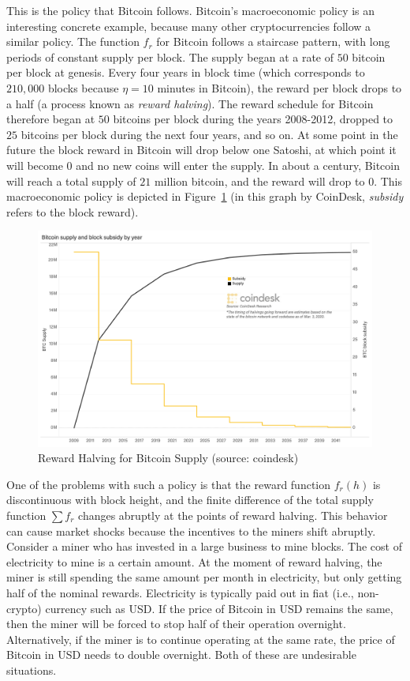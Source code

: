 This is the policy that Bitcoin follows.
Bitcoin's macroeconomic policy is an interesting concrete example, because
many other cryptocurrencies follow a similar policy. The function $f_r$
for Bitcoin follows a staircase pattern, with long periods of constant
supply per block. The supply began at a rate of $50$ bitcoin per block
at genesis. Every four years in block time (which corresponds to
$210{,}000$ blocks because $\eta = 10$ minutes in Bitcoin), the reward
per block drops to a half (a process known as \emph{reward halving}).
The reward schedule for Bitcoin therefore
began at $50$ bitcoins per block during the years 2008-2012, dropped
to $25$ bitcoins per block during the next four years, and so on. At
some point in the future the block reward in Bitcoin will drop below
one Satoshi, at which point it will become $0$ and no new coins will
enter the supply. In about a century, Bitcoin will reach a total supply
of $21$ million bitcoin, and the reward will drop to $0$. This
macroeconomic policy is depicted in Figure~\ref{fig:reward_halving}
(in this graph by CoinDesk, \emph{subsidy} refers to the block
reward).

\begin{figure}[ht]
    \centering
    \includegraphics[width=\columnwidth,keepaspectratio]{figures/reward_halving.png}
    \caption{Reward Halving for Bitcoin Supply (source: coindesk)}
    \label{fig:reward_halving}
\end{figure}

One of the problems with such a policy is that the reward function
$f_r(h)$ is discontinuous with block height, and the finite difference
of the total supply function $\sum f_r$ changes abruptly at the points of
reward halving. This behavior can cause market shocks because the incentives
to the miners shift abruptly. Consider a miner who has invested in a large
business to mine blocks. The cost of electricity to mine is a certain
amount. At the moment of reward halving, the miner is still spending
the same amount per month in electricity, but only getting half of the
nominal rewards. Electricity is typically paid out in fiat (i.e., non-crypto)
currency such as USD. If the price of Bitcoin in USD remains the same, then
the miner will be forced to stop half of their operation overnight.
Alternatively, if the miner is to continue operating at the same rate,
the price of Bitcoin in USD needs to double overnight. Both of these
are undesirable situations.

